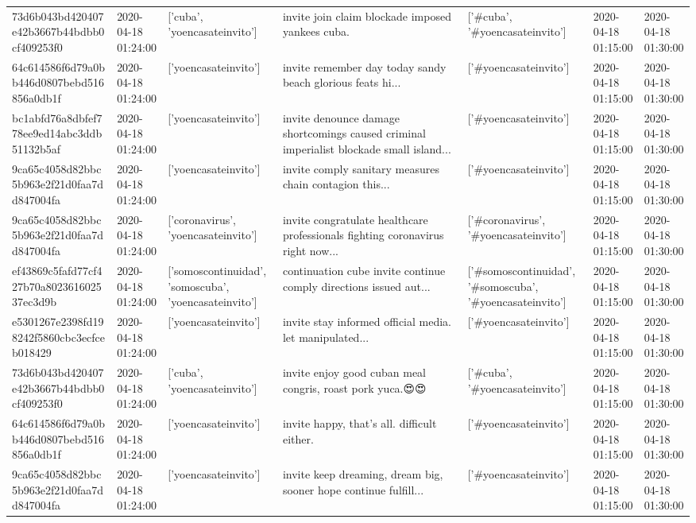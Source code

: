 \begin{tabular}{lllllll}
73d6b043bd420407e42b3667b44bdbb0cf409253f0 & 2020-04-18 01:24:00 & ['cuba', 'yoencasateinvito'] & invite join claim blockade imposed yankees cuba. & ['#cuba', '#yoencasateinvito'] & 2020-04-18 01:15:00 & 2020-04-18 01:30:00 \\
64c614586f6d79a0bb446d0807bebd516856a0db1f & 2020-04-18 01:24:00 & ['yoencasateinvito'] & invite remember day today sandy beach glorious feats hi... & ['#yoencasateinvito'] & 2020-04-18 01:15:00 & 2020-04-18 01:30:00 \\
bc1abfd76a8dbfef778ee9ed14abc3ddb51132b5af & 2020-04-18 01:24:00 & ['yoencasateinvito'] & invite denounce damage shortcomings caused criminal imperialist blockade small island... & ['#yoencasateinvito'] & 2020-04-18 01:15:00 & 2020-04-18 01:30:00 \\
9ca65c4058d82bbc5b963e2f21d0faa7dd847004fa & 2020-04-18 01:24:00 & ['yoencasateinvito'] & invite comply sanitary measures chain contagion this... & ['#yoencasateinvito'] & 2020-04-18 01:15:00 & 2020-04-18 01:30:00 \\
9ca65c4058d82bbc5b963e2f21d0faa7dd847004fa & 2020-04-18 01:24:00 & ['coronavirus', 'yoencasateinvito'] & invite congratulate healthcare professionals fighting coronavirus right now... & ['#coronavirus', '#yoencasateinvito'] & 2020-04-18 01:15:00 & 2020-04-18 01:30:00 \\
ef43869c5fafd77cf427b70a802361602537ec3d9b & 2020-04-18 01:24:00 & ['somoscontinuidad', 'somoscuba', 'yoencasateinvito'] & continuation cube invite continue comply directions issued aut... & ['#somoscontinuidad', '#somoscuba', '#yoencasateinvito'] & 2020-04-18 01:15:00 & 2020-04-18 01:30:00 \\
e5301267e2398fd198242f5860cbc3ecfceb018429 & 2020-04-18 01:24:00 & ['yoencasateinvito'] & invite stay informed official media. let manipulated... & ['#yoencasateinvito'] & 2020-04-18 01:15:00 & 2020-04-18 01:30:00 \\
73d6b043bd420407e42b3667b44bdbb0cf409253f0 & 2020-04-18 01:24:00 & ['cuba', 'yoencasateinvito'] & invite enjoy good cuban meal congris, roast pork yuca.😍😍 & ['#cuba', '#yoencasateinvito'] & 2020-04-18 01:15:00 & 2020-04-18 01:30:00 \\
64c614586f6d79a0bb446d0807bebd516856a0db1f & 2020-04-18 01:24:00 & ['yoencasateinvito'] & invite happy, that's all. difficult either. & ['#yoencasateinvito'] & 2020-04-18 01:15:00 & 2020-04-18 01:30:00 \\
9ca65c4058d82bbc5b963e2f21d0faa7dd847004fa & 2020-04-18 01:24:00 & ['yoencasateinvito'] & invite keep dreaming, dream big, sooner hope continue fulfill... & ['#yoencasateinvito'] & 2020-04-18 01:15:00 & 2020-04-18 01:30:00 \\

\end{tabular}
